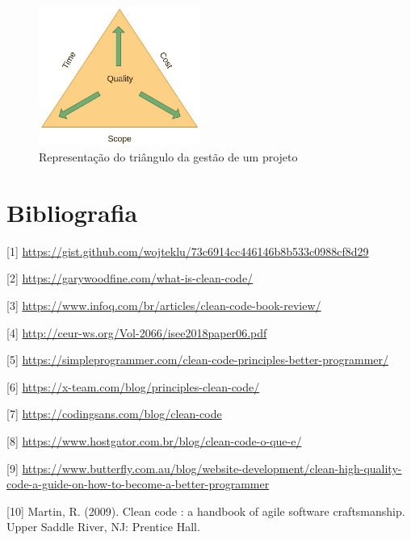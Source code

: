 \documentclass[10pt,portuguese]{article}
\begin{document}
\begin{figure}[!h]
    \centering
    \includegraphics[width=200]{images/quality-triangle.jpg}
    \caption{Representação do triângulo da gestão de um projeto}
\end{figure}
 
\clearpage

\section{Bibliografia}





\vspace{5mm} %

[1] \url{https://gist.github.com/wojteklu/73c6914cc446146b8b533c0988cf8d29}

[2] \url{https://garywoodfine.com/what-is-clean-code/}

[3] \url{https://www.infoq.com/br/articles/clean-code-book-review/}

[4] \url{http://ceur-ws.org/Vol-2066/isee2018paper06.pdf}

[5] \url{https://simpleprogrammer.com/clean-code-principles-better-programmer/}

[6] \url{https://x-team.com/blog/principles-clean-code/}

[7] \url{https://codingsans.com/blog/clean-code}

[8] \url{https://www.hostgator.com.br/blog/clean-code-o-que-e/}

[9] \url{https://www.butterfly.com.au/blog/website-development/clean-high-quality-code-a-guide-on-how-to-become-a-better-programmer}

[10] Martin, R. (2009). Clean code : a handbook of agile software craftsmanship. Upper Saddle River, NJ: Prentice Hall.
\end{document}
